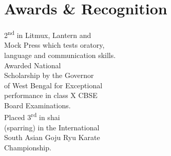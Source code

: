 \documentclass[letterpaper]{deedy-resume} %
\begin{document}

\begin{minipage}[t]{0.23\textwidth} %

\section{Awards \& Recognition}
\footnotesize{
\textbullet[2009]{} 2\textsuperscript{nd} in Litmux, Lantern and \\ \hphantom{\textbullet{}} Mock Press which tests oratory,
\\ \hphantom{\textbullet{}} language and communication skills.\\
\textbullet[2006]{} Awarded National \\ \hphantom{\textbullet{}} Scholarship by the Governor \\ \hphantom{\textbullet{}} of West Bengal for
Exceptional \\ \hphantom{\textbullet{}} performance in class X CBSE \\ \hphantom{\textbullet{}} Board Examinations.\\
\textbullet[2003]{} Placed 3\textsuperscript{rd} in shai \\ \hphantom{\textbullet{}} (sparring) in the International \\ \hphantom{\textbullet{}} South Asian
Goju Ryu Karate \\ \hphantom{\textbullet{}} Championship.\\
}


\end{minipage}
\end{document}
